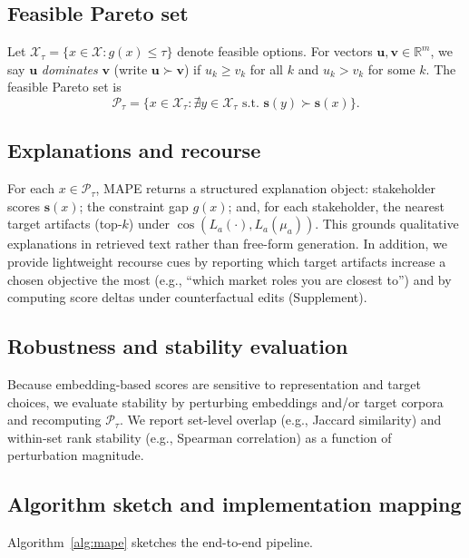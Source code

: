 \documentclass{article}
\newcommand{\MAPE}{\textsc{MAPE}\xspace}
\begin{document}
\subsection{Feasible Pareto set}
Let $\mathcal{X}_\tau=\{x\in\mathcal{X}: g(x)\le\tau\}$ denote feasible options. For vectors $\mathbf{u},\mathbf{v}\in\mathbb{R}^m$, we say $\mathbf{u}$ \emph{dominates} $\mathbf{v}$ (write $\mathbf{u}\succ \mathbf{v}$) if $u_k\ge v_k$ for all $k$ and $u_k>v_k$ for some $k$. The feasible Pareto set is
\begin{equation}
  \mathcal{P}_\tau = \big\{x\in\mathcal{X}_\tau : \nexists y\in\mathcal{X}_\tau \text{ s.t. } \mathbf{s}(y)\succ \mathbf{s}(x)\big\}.
\end{equation}

\subsection{Explanations and recourse}
\label{subsec:explain}
For each $x\in\mathcal{P}_\tau$, \MAPE returns a structured explanation object: stakeholder scores $\mathbf{s}(x)$; the constraint gap $g(x)$; and, for each stakeholder, the nearest target artifacts (top-$k$) under $\cos(L_a(\cdot),L_a(\mu_a))$. This grounds qualitative explanations in retrieved text rather than free-form generation. In addition, we provide lightweight recourse cues by reporting which target artifacts increase a chosen objective the most (e.g., ``which market roles you are closest to'') and by computing score deltas under counterfactual edits (Supplement).

\subsection{Robustness and stability evaluation}
Because embedding-based scores are sensitive to representation and target choices, we evaluate stability by perturbing embeddings and/or target corpora and recomputing $\mathcal{P}_\tau$. We report set-level overlap (e.g., Jaccard similarity) and within-set rank stability (e.g., Spearman correlation) as a function of perturbation magnitude.

\subsection{Algorithm sketch and implementation mapping}
Algorithm~\ref{alg:mape} sketches the end-to-end pipeline.
\end{document}
